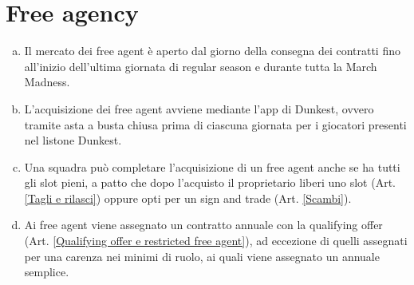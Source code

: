 \documentclass{article}
\begin{document}
\section{Free agency}\label{Free agency}
\begin{enumerate}[(a)]
\item Il mercato dei free agent è aperto dal giorno della consegna dei contratti fino all'inizio dell'ultima giornata di regular season e durante tutta la March Madness.
\item L'acquisizione dei free agent avviene mediante l'app di Dunkest, ovvero tramite asta a busta chiusa prima di ciascuna giornata per i giocatori presenti nel listone Dunkest.
\item Una squadra può completare l'acquisizione di un free agent anche se ha tutti gli slot pieni, a patto che dopo l'acquisto il proprietario liberi uno slot (Art. \ref{Tagli e rilasci}) oppure opti per un sign and trade (Art. \ref{Scambi}).
\item Ai free agent viene assegnato un contratto annuale con la qualifying offer (Art. \ref{Qualifying offer e restricted free agent}), ad eccezione di quelli assegnati per una carenza nei minimi di ruolo, ai quali viene assegnato un annuale semplice.
\end{enumerate}
\end{document}

